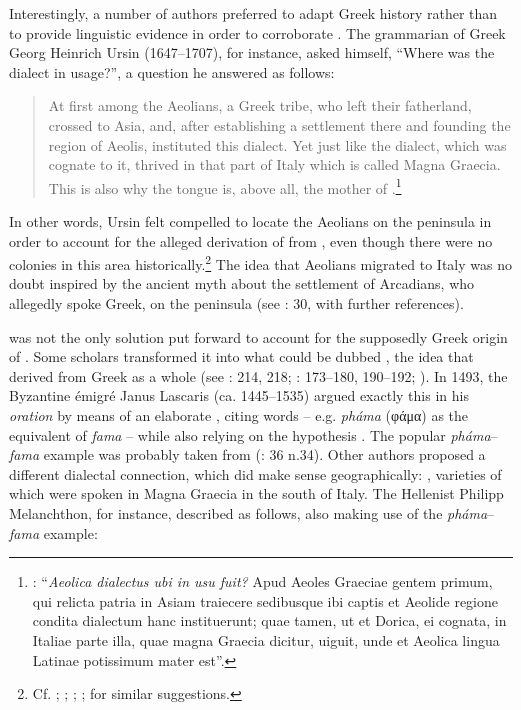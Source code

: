 Interestingly, a number of authors preferred to adapt Greek history rather than to provide linguistic evidence in order to corroborate . The grammarian of Greek Georg Heinrich Ursin (1647–1707), for instance, asked himself, “Where was the  dialect in usage?”, a question he answered as follows:

\begin{quote}
At first among the Aeolians, a Greek tribe, who left their fatherland, crossed to Asia, and, after establishing a settlement there and founding the region of Aeolis, instituted this dialect. Yet just like the  dialect, which was cognate to it,  thrived in that part of Italy which is called Magna Graecia. This is also why the  tongue is, above all, the mother of .\footnote{\citet[509]{Ursin1691}: “\textit{Aeolica dialectus ubi in usu fuit?} Apud Aeoles Graeciae gentem primum, qui relicta patria in Asiam traiecere sedibusque ibi captis et Aeolide regione condita dialectum hanc instituerunt; quae tamen, ut et Dorica, ei cognata, in Italiae parte illa, quae magna Graecia dicitur, uiguit, unde et Aeolica lingua Latinae potissimum mater est”.}
\end{quote}

In other words, Ursin felt compelled to locate the Aeolians on the  peninsula in order to account for the alleged derivation of  from , even though there were no  colonies in this area historically.\footnote{Cf. \citet[289]{[schulze]1711}; \citet[\textsc{i}.69]{Ten1723}; \citet[30]{Munthe1748}; \citet[89]{Facius1782}; \citet[199]{Ries1786} for similar suggestions.} The idea that Aeolians migrated to Italy was no doubt inspired by the ancient myth about the settlement of Arcadians, who allegedly spoke  Greek, on the peninsula (see \citealt{Lamers2019}: 30, with further references).

 was not the only solution put forward to account for the supposedly Greek origin of . Some scholars transformed it into what could be dubbed , the idea that  derived from Greek as a whole (see \citealt{Tavoni1986}: 214, 218; \citealt{Lamers2015}: 173–180, 190–192; \citeyear{Lamers2019}). In 1493, the Byzantine émigré Janus Lascaris (ca. 1445–1535) argued exactly this in his \textit{ oration} by means of an elaborate , citing  words – e.g. \textit{pháma} (φάμα) as the equivalent of  \textit{fama} – while also relying on the  hypothesis \citep[179]{Lamers2015}. The popular \textit{pháma}–\textit{fama} example was probably taken from  (\citealt{Lamers2019}: 36 n.34). Other authors proposed a different dialectal connection, which did make sense geographically: , varieties of which were spoken in Magna Graecia in the south of Italy. The  Hellenist Philipp Melanchthon, for instance, described  as follows, also making use of the \textit{pháma}–\textit{fama} example:

